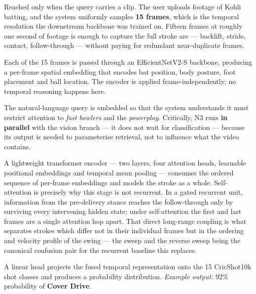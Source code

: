 \documentclass[11pt,a4paper]{article}
\begin{document}
\begin{description}[leftmargin=0em,style=nextline]
\item[N1 --- Video Input (15 Frames).]
  Reached only when the query carries a clip. The user uploads footage of Kohli
  batting, and the system uniformly samples
  \textbf{15 frames}, which is the temporal resolution the downstream backbone
  was trained on. Fifteen frames at roughly one second of footage is enough to
  capture the full stroke arc --- backlift, stride, contact, follow-through ---
  without paying for redundant near-duplicate frames.

\item[N2 --- Vision Encoder (EfficientNetV2-S).]
  Each of the 15 frames is passed through an EfficientNetV2-S backbone,
  producing a per-frame spatial embedding that encodes bat position, body
  posture, foot placement and ball location. The encoder is applied
  frame-independently; no temporal reasoning happens here.

\item[N3 --- Text Encoder (Query Semantics).]
  The natural-language query is embedded so that the system understands it must
  restrict attention to \emph{fast bowlers} and the \emph{powerplay}. Critically,
  N3 runs \textbf{in parallel} with the vision branch --- it does not wait for
  classification --- because its output is needed to parameterise retrieval, not
  to influence what the video contains.

\item[N4 --- Temporal Fusion (Temporal Transformer).]
  A lightweight transformer encoder --- two layers, four attention heads,
  learnable positional embeddings and temporal mean pooling --- consumes the
  ordered sequence of per-frame embeddings and models the stroke as a whole.
  Self-attention is precisely why this stage is not recurrent. In a gated
  recurrent unit, information from the pre-delivery stance reaches the
  follow-through only by surviving every intervening hidden state; under
  self-attention the first and last frames are a single attention hop apart.
  That direct long-range coupling is what separates strokes which differ not in
  their individual frames but in the ordering and velocity profile of the swing
  --- the sweep and the reverse sweep being the canonical confusion pair for the
  recurrent baseline this replaces.

\item[N5 --- Classifier Head (15 Shot Classes).]
  A linear head projects the fused temporal representation onto the 15
  CricShot10k shot classes and produces a probability distribution.
  \emph{Example output:} $92\%$ probability of \textbf{Cover Drive}.
\end{description}
\end{document}
